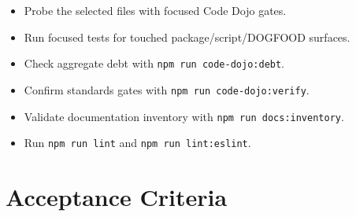 \begin{itemize}
\tightlist
\item
  Probe the selected files with focused Code Dojo gates.
\item
  Run focused tests for touched package/script/DOGFOOD surfaces.
\item
  Check aggregate debt with \texttt{n\allowbreak{}p\allowbreak{}m\allowbreak{} \allowbreak{}r\allowbreak{}u\allowbreak{}n\allowbreak{} \allowbreak{}c\allowbreak{}o\allowbreak{}d\allowbreak{}e\allowbreak{}-\allowbreak{}d\allowbreak{}o\allowbreak{}j\allowbreak{}o\allowbreak{}:\allowbreak{}d\allowbreak{}e\allowbreak{}b\allowbreak{}t}.
\item
  Confirm standards gates with \texttt{n\allowbreak{}p\allowbreak{}m\allowbreak{} \allowbreak{}r\allowbreak{}u\allowbreak{}n\allowbreak{} \allowbreak{}c\allowbreak{}o\allowbreak{}d\allowbreak{}e\allowbreak{}-\allowbreak{}d\allowbreak{}o\allowbreak{}j\allowbreak{}o\allowbreak{}:\allowbreak{}v\allowbreak{}e\allowbreak{}r\allowbreak{}i\allowbreak{}f\allowbreak{}y}.
\item
  Validate documentation inventory with \texttt{n\allowbreak{}p\allowbreak{}m\allowbreak{} \allowbreak{}r\allowbreak{}u\allowbreak{}n\allowbreak{} \allowbreak{}d\allowbreak{}o\allowbreak{}c\allowbreak{}s\allowbreak{}:\allowbreak{}i\allowbreak{}n\allowbreak{}v\allowbreak{}e\allowbreak{}n\allowbreak{}t\allowbreak{}o\allowbreak{}r\allowbreak{}y}.
\item
  Run \texttt{n\allowbreak{}p\allowbreak{}m\allowbreak{} \allowbreak{}r\allowbreak{}u\allowbreak{}n\allowbreak{} \allowbreak{}l\allowbreak{}i\allowbreak{}n\allowbreak{}t} and \texttt{n\allowbreak{}p\allowbreak{}m\allowbreak{} \allowbreak{}r\allowbreak{}u\allowbreak{}n\allowbreak{} \allowbreak{}l\allowbreak{}i\allowbreak{}n\allowbreak{}t\allowbreak{}:\allowbreak{}e\allowbreak{}s\allowbreak{}l\allowbreak{}i\allowbreak{}n\allowbreak{}t}.
\end{itemize}

\section{Acceptance Criteria}\label{record-228-acceptance-criteria}

